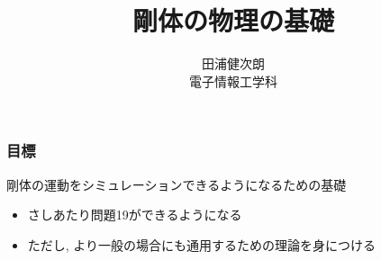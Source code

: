 \documentclass[10pt,dvipdfmx]{beamer}
\title{剛体の物理の基礎}
\institute{東京大学}
\author{田浦健次朗 \\ 電子情報工学科}
\date{}
\begin{document}
\maketitle





\section{}

\begin{frame}
\frametitle{目標}
剛体の運動をシミュレーションできるようになるための基礎

\begin{itemize}
\item さしあたり問題19ができるようになる
\item ただし, 
より一般の場合にも通用するための理論を身につける
\end{itemize}

\end{frame}
\end{document}
